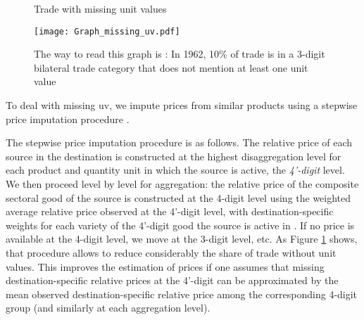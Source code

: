 \documentclass[12pt,twoside,a4paper,notitlepage]{article}
\begin{document}
\begin{figure}
\caption{Trade with missing unit values}
\texttt{[image: Graph\_missing\_uv.pdf]}
\label{fig:missing_uv}
\caption*{The way to read this graph is : In 1962, 10\% of trade is in a 3-digit bilateral trade category that does not mention at least one unit value}
\end{figure}




To deal with missing uv, we impute prices from similar products using a stepwise price imputation procedure
.

The stepwise price imputation procedure is as follows. The relative price of each source in the destination is constructed at the highest disaggregation level for each product and quantity unit in which the source is active, the \textit{4'-digit} level. We then proceed level by level for aggregation: the relative price of the composite sectoral good of the source is constructed at the 4-digit level using the weighted average relative price observed at the 4'-digit level, with destination-specific weights for each variety of the 4'-digit good the source is active in%
. If no price is available at the 4-digit level, we move at the 3-digit level, etc. As Figure \ref{fig:missing_uv} shows, that procedure allows to reduce considerably the share of trade without unit values. This improves the estimation of prices if one assumes that missing destination-specific relative prices at the 4'-digit can be approximated by the mean observed destination-specific relative price among the corresponding 4-digit group (and similarly at each aggregation level). 
\end{document}
